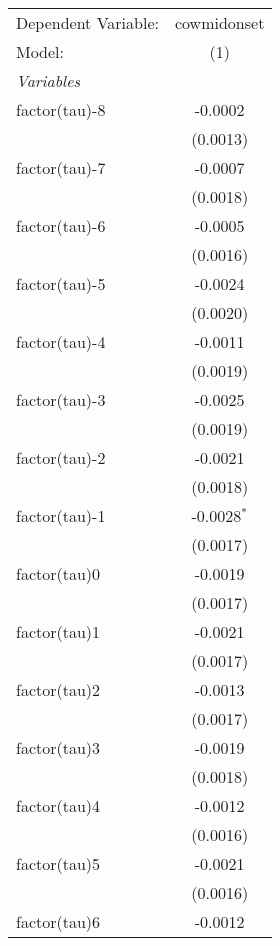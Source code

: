 \begingroup
\centering
\begin{tabular}{lc}
   \tabularnewline \midrule \midrule
   Dependent Variable: & cowmidonset\\  
   Model:              & (1)\\  
   \midrule
   \emph{Variables}\\
   factor(tau)-8       & -0.0002\\   
                       & (0.0013)\\   
   factor(tau)-7       & -0.0007\\   
                       & (0.0018)\\   
   factor(tau)-6       & -0.0005\\   
                       & (0.0016)\\   
   factor(tau)-5       & -0.0024\\   
                       & (0.0020)\\   
   factor(tau)-4       & -0.0011\\   
                       & (0.0019)\\   
   factor(tau)-3       & -0.0025\\   
                       & (0.0019)\\   
   factor(tau)-2       & -0.0021\\   
                       & (0.0018)\\   
   factor(tau)-1       & -0.0028$^{*}$\\   
                       & (0.0017)\\   
   factor(tau)0        & -0.0019\\   
                       & (0.0017)\\   
   factor(tau)1        & -0.0021\\   
                       & (0.0017)\\   
   factor(tau)2        & -0.0013\\   
                       & (0.0017)\\   
   factor(tau)3        & -0.0019\\   
                       & (0.0018)\\   
   factor(tau)4        & -0.0012\\   
                       & (0.0016)\\   
   factor(tau)5        & -0.0021\\   
                       & (0.0016)\\   
   factor(tau)6        & -0.0012\\   

\end{tabular}
